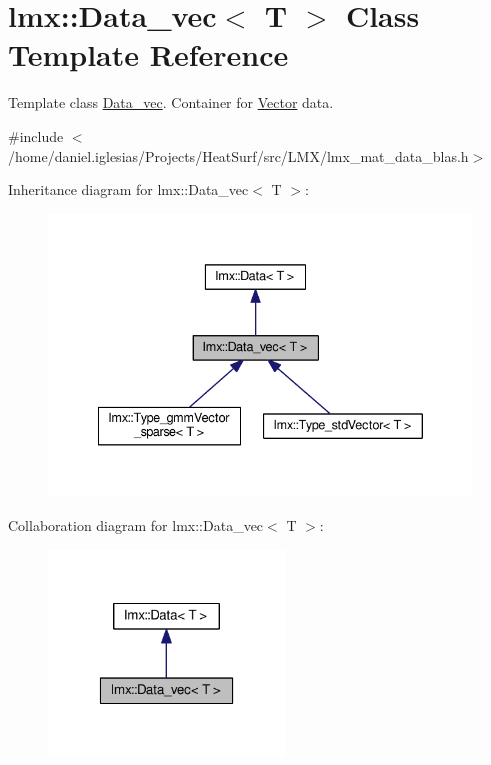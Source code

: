 \hypertarget{classlmx_1_1Data__vec}{\section{lmx\-:\-:Data\-\_\-vec$<$ T $>$ Class Template Reference}
\label{classlmx_1_1Data__vec}
}


Template class \hyperlink{classlmx_1_1Data__vec}{Data\-\_\-vec}. Container for \hyperlink{classlmx_1_1Vector}{Vector} data.  




{\ttfamily \#include $<$/home/daniel.\-iglesias/\-Projects/\-Heat\-Surf/src/\-L\-M\-X/lmx\-\_\-mat\-\_\-data\-\_\-blas.\-h$>$}



Inheritance diagram for lmx\-:\-:Data\-\_\-vec$<$ T $>$\-:
\nopagebreak
\begin{figure}[H]
\begin{center}
\leavevmode
\includegraphics[width=335pt]{classlmx_1_1Data__vec__inherit__graph}
\end{center}
\end{figure}


Collaboration diagram for lmx\-:\-:Data\-\_\-vec$<$ T $>$\-:
\nopagebreak
\begin{figure}[H]
\begin{center}
\leavevmode
\includegraphics[width=178pt]{classlmx_1_1Data__vec__coll__graph}
\end{center}
\end{figure}
